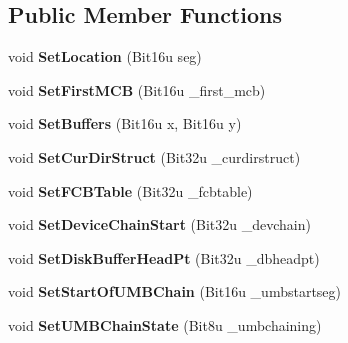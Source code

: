 \subsection*{Public Member Functions}
\begin{DoxyCompactItemize}
\item 
\hypertarget{classDOS__InfoBlock_a417fc25936c4a52f2a99876547b2c147}{void {\bfseries Set\-Location} (Bit16u seg)}\label{classDOS__InfoBlock_a417fc25936c4a52f2a99876547b2c147}

\item 
\hypertarget{classDOS__InfoBlock_ae414c1cdad096ba6406fb3fc2c0c170c}{void {\bfseries Set\-First\-M\-C\-B} (Bit16u \-\_\-first\-\_\-mcb)}\label{classDOS__InfoBlock_ae414c1cdad096ba6406fb3fc2c0c170c}

\item 
\hypertarget{classDOS__InfoBlock_abc300d0727e3af5fdb36a10825563667}{void {\bfseries Set\-Buffers} (Bit16u x, Bit16u y)}\label{classDOS__InfoBlock_abc300d0727e3af5fdb36a10825563667}

\item 
\hypertarget{classDOS__InfoBlock_ad791de6c1f21c2b80c18e92b27d6c669}{void {\bfseries Set\-Cur\-Dir\-Struct} (Bit32u \-\_\-curdirstruct)}\label{classDOS__InfoBlock_ad791de6c1f21c2b80c18e92b27d6c669}

\item 
\hypertarget{classDOS__InfoBlock_aa071066b03d8296c56d2493897c1fffc}{void {\bfseries Set\-F\-C\-B\-Table} (Bit32u \-\_\-fcbtable)}\label{classDOS__InfoBlock_aa071066b03d8296c56d2493897c1fffc}

\item 
\hypertarget{classDOS__InfoBlock_a18c48672d245da38ab99dfc044a4ba6a}{void {\bfseries Set\-Device\-Chain\-Start} (Bit32u \-\_\-devchain)}\label{classDOS__InfoBlock_a18c48672d245da38ab99dfc044a4ba6a}

\item 
\hypertarget{classDOS__InfoBlock_aabe3e920de901f1a0ad5534dd28f9143}{void {\bfseries Set\-Disk\-Buffer\-Head\-Pt} (Bit32u \-\_\-dbheadpt)}\label{classDOS__InfoBlock_aabe3e920de901f1a0ad5534dd28f9143}

\item 
\hypertarget{classDOS__InfoBlock_a1970bbfbf1221532af106c9029850e39}{void {\bfseries Set\-Start\-Of\-U\-M\-B\-Chain} (Bit16u \-\_\-umbstartseg)}\label{classDOS__InfoBlock_a1970bbfbf1221532af106c9029850e39}

\item 
\hypertarget{classDOS__InfoBlock_a4cfe16a819771ebc45bcbf89cc3a3d06}{void {\bfseries Set\-U\-M\-B\-Chain\-State} (Bit8u \-\_\-umbchaining)}\label{classDOS__InfoBlock_a4cfe16a819771ebc45bcbf89cc3a3d06}


\end{DoxyCompactItemize}
